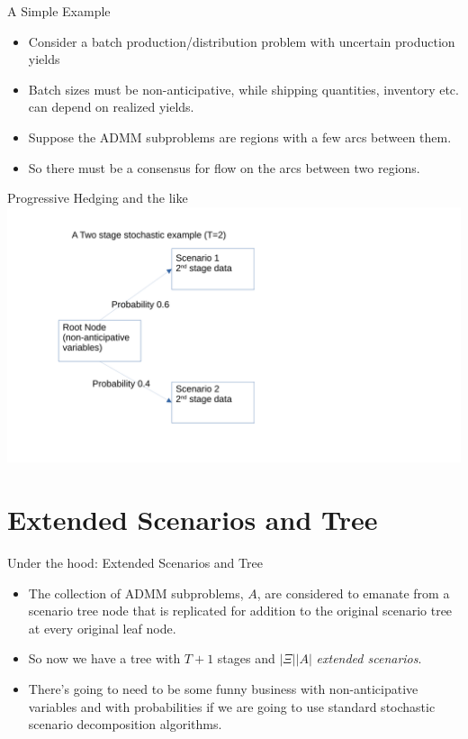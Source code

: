 \documentclass[9pt,usenames,dvipsnames]{beamer}
\begin{document}
\begin{frame}{A Simple Example}
  \begin{itemize}
  \item Consider a batch production/distribution problem with uncertain production yields
  \item Batch sizes must be non-anticipative, while shipping quantities, inventory etc. can depend on realized yields.
  \item Suppose the ADMM subproblems are regions with a few arcs between them.
    \item So there must be a consensus for flow on the arcs between two regions.
  \end{itemize}


\end{frame}

\begin{frame}{Progressive Hedging and the like}
\centering
 \includegraphics[width=1.1\linewidth]{tree1.pdf}
\end{frame}

\section{Extended Scenarios and Tree}
\begin{frame}{Under the hood: Extended Scenarios and Tree}
  \begin{itemize}
\item The collection of ADMM subproblems, $A$, are considered to emanate from a scenario tree node that is replicated for addition
  to the original scenario tree at every original leaf node.
\item So now we have a tree with $T+1$ stages and $|\Xi| |A|$ {\em extended scenarios}.
\item There's going to need to be some funny business with non-anticipative variables and with probabilities if we are going to use standard stochastic scenario
  decomposition algorithms.
\end{itemize}
\end{frame}
\end{document}
